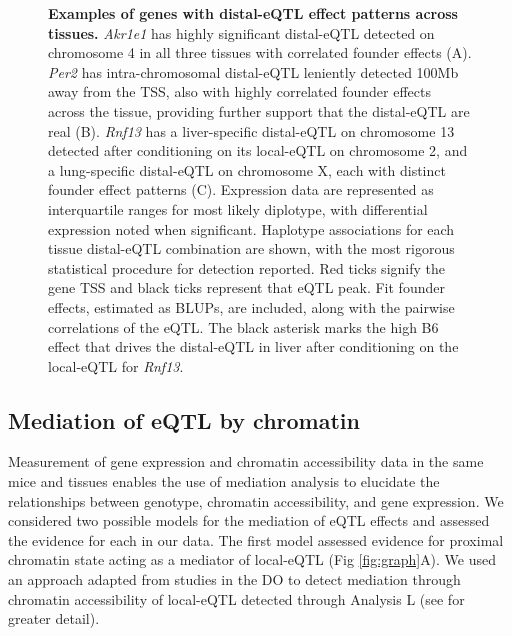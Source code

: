 \documentclass[10pt,letterpaper]{article}
\begin{document}
\begin{figure}[h!]
\caption{\textbf{Examples of genes with distal-eQTL effect patterns across tissues.} \textit{Akr1e1} has highly significant distal-eQTL detected on chromosome 4 in all three tissues with correlated founder effects (A). \textit{Per2} has intra-chromosomal distal-eQTL leniently detected 100Mb away from the TSS, also with highly correlated founder effects across the tissue, providing further support that the distal-eQTL are real (B). \textit{Rnf13} has a liver-specific distal-eQTL on chromosome 13 detected after conditioning on its local-eQTL on chromosome 2, and a lung-specific distal-eQTL on chromosome X, each with distinct founder effect patterns (C). Expression data are represented as interquartile ranges for most likely diplotype, with differential expression noted when significant. Haplotype associations for each tissue distal-eQTL combination are shown, with the most rigorous statistical procedure for detection reported. Red ticks signify the gene TSS and black ticks represent that eQTL peak. Fit founder effects, estimated as BLUPs, are included, along with the pairwise correlations of the eQTL. The black asterisk marks the high B6 effect that drives the distal-eQTL in liver after conditioning on the local-eQTL for \textit{Rnf13}.
\label{fig:correlated_distal_eqtl}}
\end{figure}

\subsection*{Mediation of eQTL by chromatin}

Measurement of gene expression and chromatin accessibility data in the same mice and tissues enables the use of mediation analysis to elucidate the relationships between genotype, chromatin accessibility, and gene expression. 
We considered two possible models for the mediation of eQTL effects and assessed the evidence for each in our data.
The first model assessed evidence for proximal chromatin state acting as a mediator of local-eQTL (Fig \ref{fig:graph}A). We used an approach adapted from studies in the DO \cite{Chick2016} to detect mediation through chromatin accessibility of local-eQTL detected through Analysis L (see  for greater detail).  
\end{document}
